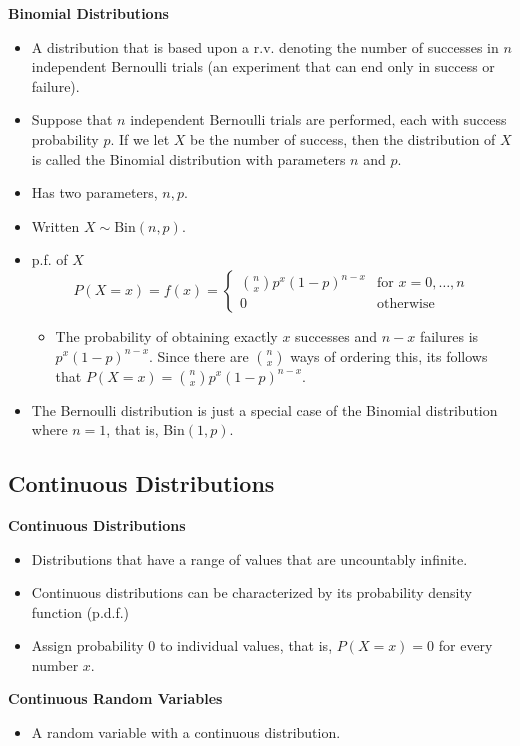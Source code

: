 \documentclass[11pt]{article}
\begin{document}
\textbf{Binomial Distributions}
\begin{itemize}
    \item A distribution that is based upon a r.v. denoting the number of successes in $n$ 
    independent Bernoulli trials (an experiment that can end only in success or failure).
    \item Suppose that $n$ independent Bernoulli trials  are performed, each with success 
    probability $p$. If we let $X$ be the number of success, then the distribution of $X$ is 
    called the Binomial distribution with parameters $n$ and $p$. 
    \item Has two parameters, $n, p$.
    \item Written $X \sim \text{Bin}(n,p)$.
    \item p.f. of $X$
    \[ P(X=x) = f(x) = \begin{cases} 
        {n \choose x}p^x{(1-p)}^{n-x} & \text{for } x=0, \ldots, n \\
        0 & \text{otherwise}
     \end{cases}
  \]
  \begin{itemize}
    \item The probability of obtaining exactly $x$ successes and $n-x$ failures is $p^x{(1-p)}
    ^{n-x}$. Since there are ${n \choose x}$ ways of ordering this, its follows that $P(X=x)=
    {n \choose x}p^x{(1-p)}^{n-x}$.
  \end{itemize}
  \item The Bernoulli distribution is just a special case of the Binomial distribution where 
  $n=1$, that is, Bin$(1, p)$.
\end{itemize}

\subsection{Continuous Distributions}

\textbf{Continuous Distributions}
\begin{itemize}
    \item Distributions that have a range of values that are uncountably infinite. 
    \item Continuous distributions can be characterized by its probability density function 
    (p.d.f.)
    \item Assign probability 0 to individual values, that is, $P(X=x)=0$ for every number $x$.
\end{itemize}

\textbf{Continuous Random Variables}
\begin{itemize}
    \item A random variable with a continuous distribution.
\end{itemize}
\end{document}
